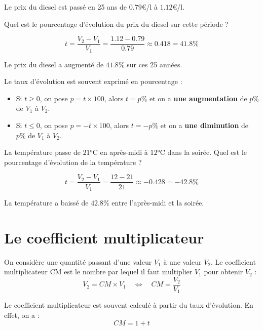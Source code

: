 \begin{ex}{}{}
Le prix du diesel est passé en 25 ans de $0.79$€/l à $1.12$€/l. 

\noindent Quel est le pourcentage d'évolution du prix du diesel sur cette période ?

\[t = \frac{V_{2}-V_{1}}{V_{1}} = \frac{1.12 - 0.79}{0.79}\approx 0.418 = 41.8\%\]

\noindent Le prix du diesel a augmenté de $41.8\%$ sur ces 25 années.
\end{ex}

\begin{rem}{}{}
Le taux d'évolution est souvent exprimé en pourcentage : 
\begin{itemize}
\item[-] Si $t \geqslant 0$, on pose $p = t\times 100$, alors $t = p\%$ et on a \textbf{une augmentation} de $p\%$ de $V_{1}$ à $V_{2}$. 
\item[-] Si $t \leqslant 0$, on pose $p = - t\times 100$, alors $t = - p\%$ et on a \textbf{une diminution} de $p\%$ de $V_{1}$ à $V_{2}$.
\end{itemize}
\end{rem}

\begin{ex}{}{}
La température passe de $21$°C en après-midi à $12$°C dans la soirée. Quel est le pourcentage d'évolution de la température ?

\[t = \frac{V_{2}-V_{1}}{V_{1}} = \frac{12 - 21}{21}\approx -0.428 = -42.8\%\]

\noindent La température a baissé de $42.8\%$ entre l'après-midi et la soirée.
\end{ex}

\section{Le coefficient multiplicateur}

\begin{defi}{}{}
On considère une quantité passant d'une valeur $V_{1}$ à une valeur $V_{2}$. Le coefficient multiplicateur CM est le nombre par lequel il faut multiplier $V_{1}$ pour obtenir $V_{2}$ :
\[V_{2} = CM\times V_{1} \quad \Longleftrightarrow \quad CM = \frac{V_{2}}{V_{1}}\]
\end{defi}

\begin{rem}{}{}
Le coefficient multiplicateur est souvent calculé à partir du taux d'évolution. En effet, on a : $$CM = 1 + t$$
\end{rem}

